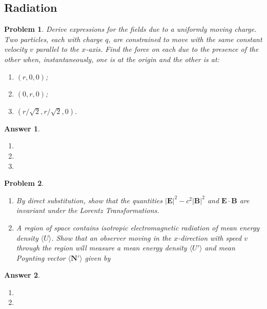 \documentclass[a4paper]{article}
\newtheorem{ans}{Answer}
\theoremstyle{new}
\newtheorem{qns}{Problem}
\begin{document}
\subsection*{Radiation}
\begin{qns}
Derive expressions for the fields due to a uniformly moving charge.\\[5pt]
Two particles, each with charge $q$, are constrained to move with the same constant velocity $v$ parallel to the $x$-axis. Find the force on each due to the presence of the other when, instantaneously, one is at the origin and the other is at:
\begin{enumerate}[label=(\alph*)]
\item $(r, 0, 0)$;
\item $(0, r, 0)$;
\item $(r/\sqrt{2},r/\sqrt{2},0)$.
\end{enumerate}
\end{qns}
\begin{ans}\leavevmode
\begin{enumerate}[label=(\alph*)]
\item 

\item 

\item
\end{enumerate}
\end{ans}
\newpage
\begin{qns}\leavevmode
\begin{enumerate}[label=(\roman*)]
\item  By direct substitution, show that the quantities $|\mathbf{E}|^2-c^2|\mathbf{B}|^2$ and $\mathbf{E}\cdot\mathbf{B}$ are invariant under the Lorentz Transformations.
\item A region of space contains isotropic electromagnetic radiation of mean energy density $\langle U\rangle$. Show that an observer moving in the $x$-direction with speed $v$ through the region will measure a mean energy density $\langle U'\rangle$ and mean Poynting vector $\langle \mathbf{N'}\rangle$ given by
\end{enumerate}
\end{qns}
\begin{ans}\leavevmode
\begin{enumerate}[label=(\roman*)]
\item 

\item 

\end{enumerate}
\end{ans}
\end{document}

